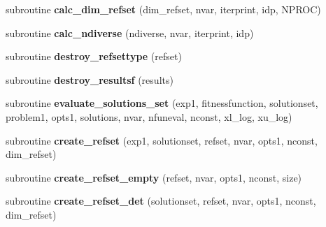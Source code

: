 \begin{DoxyCompactItemize}
\item 
\hypertarget{classscattersearchfunctions_acb16092f20ccb4d7c8a44dd0eff63f3d}{subroutine {\bfseries calc\-\_\-dim\-\_\-refset} (dim\-\_\-refset, nvar, iterprint, idp, N\-P\-R\-O\-C)}\label{classscattersearchfunctions_acb16092f20ccb4d7c8a44dd0eff63f3d}

\item 
\hypertarget{classscattersearchfunctions_a9fcad831ec55e4c9d45a9a5421f5af4e}{subroutine {\bfseries calc\-\_\-ndiverse} (ndiverse, nvar, iterprint, idp)}\label{classscattersearchfunctions_a9fcad831ec55e4c9d45a9a5421f5af4e}

\item 
\hypertarget{classscattersearchfunctions_a9268b3057be8cac8265edb5ac2df2d01}{subroutine {\bfseries destroy\-\_\-refsettype} (refset)}\label{classscattersearchfunctions_a9268b3057be8cac8265edb5ac2df2d01}

\item 
\hypertarget{classscattersearchfunctions_ae9d49ca40348d2b7a40f9ccaa0df362b}{subroutine {\bfseries destroy\-\_\-resultsf} (results)}\label{classscattersearchfunctions_ae9d49ca40348d2b7a40f9ccaa0df362b}

\item 
\hypertarget{classscattersearchfunctions_a8e59605301c5a93c24b9239451aae7e6}{subroutine {\bfseries evaluate\-\_\-solutions\-\_\-set} (exp1, fitnessfunction, solutionset, problem1, opts1, solutions, nvar, nfuneval, nconst, xl\-\_\-log, xu\-\_\-log)}\label{classscattersearchfunctions_a8e59605301c5a93c24b9239451aae7e6}

\item 
\hypertarget{classscattersearchfunctions_a293007e9db84899d65f9d814a4253610}{subroutine {\bfseries create\-\_\-refset} (exp1, solutionset, refset, nvar, opts1, nconst, dim\-\_\-refset)}\label{classscattersearchfunctions_a293007e9db84899d65f9d814a4253610}

\item 
\hypertarget{classscattersearchfunctions_a667f397fd1bc01739f6dba3fb3cd2c87}{subroutine {\bfseries create\-\_\-refset\-\_\-empty} (refset, nvar, opts1, nconst, size)}\label{classscattersearchfunctions_a667f397fd1bc01739f6dba3fb3cd2c87}

\item 
\hypertarget{classscattersearchfunctions_a7a1b919ff5cf82582d5ceab2ec7a3120}{subroutine {\bfseries create\-\_\-refset\-\_\-det} (solutionset, refset, nvar, opts1, nconst, dim\-\_\-refset)}\label{classscattersearchfunctions_a7a1b919ff5cf82582d5ceab2ec7a3120}


\end{DoxyCompactItemize}
